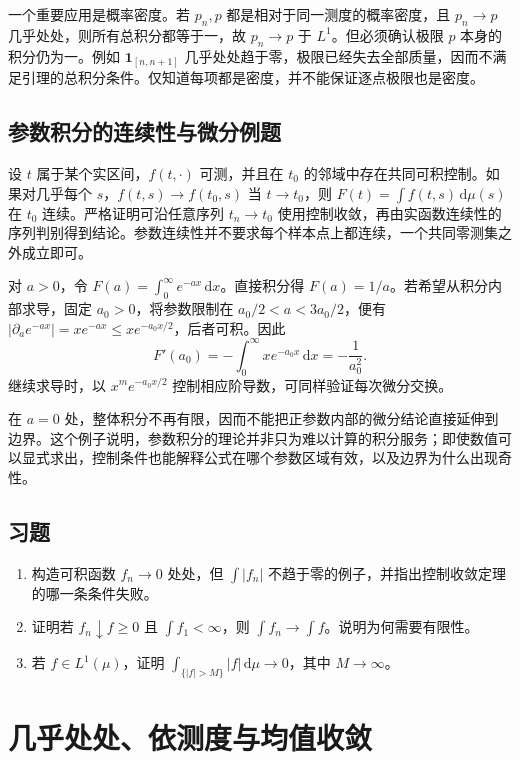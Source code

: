 \documentclass[UTF8,12pt,a4paper,fontset=fandol]{ctexbook}
\begin{document}
一个重要应用是概率密度。若 $p_n,p$ 都是相对于同一测度的概率密度，且 $p_n\to p$ 几乎处处，则所有总积分都等于一，故 $p_n\to p$ 于 $L^1$。但必须确认极限 $p$ 本身的积分仍为一。例如 $\mathbf1_{[n,n+1]}$ 几乎处处趋于零，极限已经失去全部质量，因而不满足引理的总积分条件。仅知道每项都是密度，并不能保证逐点极限也是密度。

\section{参数积分的连续性与微分例题}
设 $t$ 属于某个实区间，$f(t,\cdot)$ 可测，并且在 $t_0$ 的邻域中存在共同可积控制。如果对几乎每个 $s$，$f(t,s)\to f(t_0,s)$ 当 $t\to t_0$，则 $F(t)=\int f(t,s)\,\mathrm d\mu(s)$ 在 $t_0$ 连续。严格证明可沿任意序列 $t_n\to t_0$ 使用控制收敛，再由实函数连续性的序列判别得到结论。参数连续性并不要求每个样本点上都连续，一个共同零测集之外成立即可。

\begin{example}[拉普拉斯型积分]
对 $a>0$，令 $F(a)=\int_0^\infty e^{-ax}\,\mathrm dx$。直接积分得 $F(a)=1/a$。若希望从积分内部求导，固定 $a_0>0$，将参数限制在 $a_0/2<a<3a_0/2$，便有
$|\partial_ae^{-ax}|=xe^{-ax}\leq xe^{-a_0x/2}$，后者可积。因此
\[
 F'(a_0)=-\int_0^\infty xe^{-a_0x}\,\mathrm dx=-\frac1{a_0^2}.
\]
继续求导时，以 $x^me^{-a_0x/2}$ 控制相应阶导数，可同样验证每次微分交换。
\end{example}

在 $a=0$ 处，整体积分不再有限，因而不能把正参数内部的微分结论直接延伸到边界。这个例子说明，参数积分的理论并非只为难以计算的积分服务；即使数值可以显式求出，控制条件也能解释公式在哪个参数区域有效，以及边界为什么出现奇性。

\section{习题}
\begin{enumerate}
 \item 构造可积函数 $f_n\to0$ 处处，但 $\int|f_n|$ 不趋于零的例子，并指出控制收敛定理的哪一条条件失败。
 \item 证明若 $f_n\downarrow f\geq0$ 且 $\int f_1<\infty$，则 $\int f_n\to\int f$。说明为何需要有限性。
 \item 若 $f\in L^1(\mu)$，证明 $\int_{\{|f|>M\}}|f|\,\mathrm d\mu\to0$，其中 $M\to\infty$。
\end{enumerate}

\chapter{几乎处处、依测度与均值收敛}
\label{chap:mt-modes}
\end{document}
